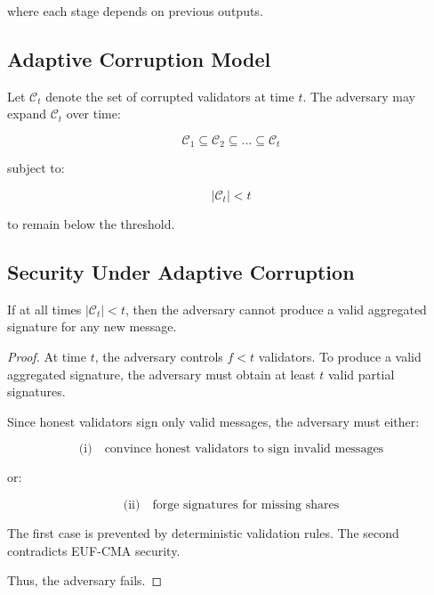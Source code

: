 where each stage depends on previous outputs.

\subsection{Adaptive Corruption Model}

Let $\mathcal{C}_t$ denote the set of corrupted validators at time $t$. The adversary may expand $\mathcal{C}_t$ over time:

\begin{equation}
\mathcal{C}_1 \subseteq \mathcal{C}_2 \subseteq \dots \subseteq \mathcal{C}_t
\end{equation}

subject to:

\begin{equation}
|\mathcal{C}_t| < t
\end{equation}

to remain below the threshold.

\subsection{Security Under Adaptive Corruption}

\begin{theorem}
If at all times $|\mathcal{C}_t| < t$, then the adversary cannot produce a valid aggregated signature for any new message.
\end{theorem}

\begin{proof}
At time $t$, the adversary controls $f < t$ validators. To produce a valid aggregated signature, the adversary must obtain at least $t$ valid partial signatures.

Since honest validators sign only valid messages, the adversary must either:

\begin{equation}
\text{(i)} \quad \text{convince honest validators to sign invalid messages}
\end{equation}

or:

\begin{equation}
\text{(ii)} \quad \text{forge signatures for missing shares}
\end{equation}

The first case is prevented by deterministic validation rules. The second contradicts EUF-CMA security.

Thus, the adversary fails.
\end{proof}

